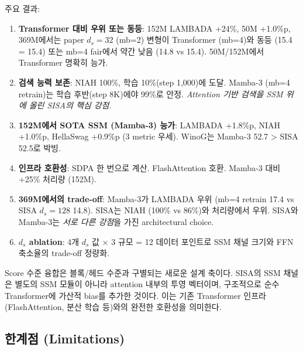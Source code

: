 \documentclass[11pt]{article}
\begin{document}
주요 결과:
\begin{enumerate}[leftmargin=*]
\item \textbf{Transformer 대비 우위 또는 동등}: 152M LAMBADA +24\%, 50M +1.0\%p, 369M에서는 paper $d_s=32$ (mb=2) 변형이 Transformer (mb=4)와 동등 (15.4 = 15.4) 또는 mb=4 fair에서 약간 낮음 (14.8 vs 15.4). 50M/152M에서 Transformer 명확히 능가.
\item \textbf{검색 능력 보존}: NIAH 100\%, 학습 10\%(step 1,000)에 도달. Mamba-3 (mb=4 retrain)는 학습 후반(step 8K)에야 99\%로 안정. \textit{Attention 기반 검색을 SSM 위에 올린 SISA의 핵심 강점}.
\item \textbf{152M에서 SOTA SSM (Mamba-3) 능가}: LAMBADA +1.8\%p, NIAH +1.0\%p, HellaSwag +0.9\%p (3 metric 우세). WinoG는 Mamba-3 52.7 > SISA 52.5로 박빙.
\item \textbf{인프라 호환성}: SDPA 한 번으로 계산. FlashAttention 호환. Mamba-3 대비 +25\% 처리량 (152M).
\item \textbf{369M에서의 trade-off}: Mamba-3가 LAMBADA 우위 (mb=4 retrain 17.4 vs SISA $d_s=128$ 14.8). SISA는 NIAH (100\% vs 86\%)와 처리량에서 우위. SISA와 Mamba-3는 \textit{서로 다른 강점}을 가진 architectural choice.
\item \textbf{$d_s$ ablation}: 4개 $d_s$ 값 × 3 규모 = 12 데이터 포인트로 SSM 채널 크기와 FFN 축소율의 trade-off 정량화.
\end{enumerate}

Score 수준 융합은 블록/헤드 수준과 구별되는 새로운 설계 축이다. SISA의 SSM 채널은 별도의 SSM 모듈이 아니라 attention 내부의 투영 벡터이며, 구조적으로 순수 Transformer에 가산적 bias를 추가한 것이다. 이는 기존 Transformer 인프라(FlashAttention, 분산 학습 등)와의 완전한 호환성을 의미한다.

\subsection{한계점 (Limitations)}
\end{document}
